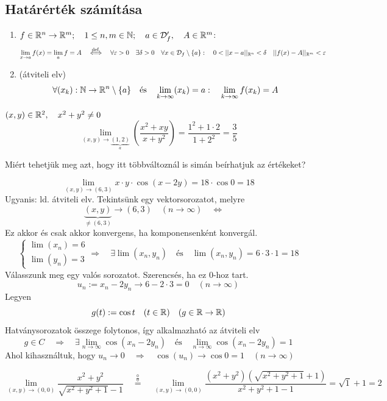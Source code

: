 \documentclass[a4paper,11.5pt]{article}
\begin{document}
	\subsection{Határérték számítása}
	\begin{revision}
		\begin{enumerate}
			\item $f\in\mathbb{R}^n\to\mathbb{R}^m;\quad 1\leq n,m\in\mathbb{N};\quad a\in\mathcal{D}_f',\quad A\in\mathbb{R}^m$:
			\[ \lim_{x\to a}f(x)=\lim_af=A\quad \overset{\text{def.}}{\Longleftrightarrow}\quad \forall\varepsilon>0\quad \exists\delta>0\quad \forall x\in\mathcal{D}_f\setminus\{a\}:\quad 0<||x-a||_{\R^n}<\delta\quad ||f(x)-A||_{\R^m}<\varepsilon \]
			\item (átviteli elv)\[ \forall (x_k):\mathbb{N}\to\mathbb{R}^n\setminus\{a\}\quad \text{és}\quad \lim_{k\to\infty}(x_k)=a:\quad \lim_{k\to\infty}f(x_k)=A \]
		\end{enumerate}
	\end{revision}
	\begin{task} $(x,y)\in\mathbb{R}^2,\quad x^2+y^2\not=0$
		\[ \lim_{(x,y)\to\underbrace{(1,2)}_{a}}\left(\frac{x^2+xy}{x+y^2}\right)=\frac{1^2+1\cdot2}{1+2^2}=\frac{3}{5} \]
	\end{task}
	Miért tehetjük meg azt, hogy itt többváltoznál is simán beírhatjuk az értékeket?
	\begin{task}
		\[ \lim_{(x,y)\to(6,3)}x\cdot y\cdot\cos(x-2y)=18\cdot\cos0=18 \]
		Ugyanis: ld. átviteli elv. Tekintsünk egy vektorsorozatot, melyre
		\[ \underbrace{(x,y)}_{\not=(6,3)}\to(6,3)\quad (n\to\infty)\quad \Leftrightarrow\quad  \]
		Ez akkor és csak akkor konvergens, ha komponensenként konvergál.
		\[\begin{cases}
			\lim(x_n)=6\\
			\lim(y_n)=3
		\end{cases} \Rightarrow\quad \exists\lim(x_n,y_n)\quad \text{és}\quad \lim(x_n,y_n)=6\cdot3\cdot1=18 \]
		Válasszunk meg egy valós sorozatot. Szerencsés, ha ez 0-hoz tart. %
		\[ u_n:=x_n-2y_n\to 6-2\cdot3=0\quad (n\to\infty) \]
		Legyen 
		\[ g(t):=\cos t\quad (t\in\mathbb{R})\quad (g\in\mathbb{R}\to\mathbb{R}) \]
		Hatványsorozatok összege folytonos, így alkalmazható az átviteli elv
		\[ g\in C\quad \Rightarrow\quad \exists\lim_{n\to\infty}\cos(x_n-2y_n)\quad \text{és}\quad \lim_{n\to\infty}\cos(x_n-2y_n)=1 \]
		Ahol kihasználtuk, hogy $u_n\to0\quad \Rightarrow\quad \cos(u_n)\to\cos 0=1\quad (n\to\infty)$
	\end{task}
	\begin{task}
		\[ \lim_{(x,y)\to(0,0)}\frac{x^2+y^2}{\sqrt{x^2+y^2+1}-1}\quad \overset{\frac{0}{0}}{=}\quad \lim_{(x,y)\to(0,0)}\frac{(x^2+y^2)(\sqrt{x^2+y^2+1}+1)}{x^2+y^2+1-1}=\sqrt{1}+1=2 \]
	\end{task}
\end{document}
